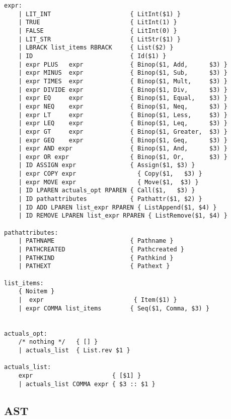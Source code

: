 \documentclass[11pt]{article}
\begin{document}
\begin{listing}[H]
  \begin{verbatim}
expr:
    | LIT_INT                      { LitInt($1) }
    | TRUE                         { LitInt(1) }
    | FALSE                        { LitInt(0) }
    | LIT_STR                      { LitStr($1) }
    | LBRACK list_items RBRACK     { List($2) }
    | ID                           { Id($1) }
    | expr PLUS   expr             { Binop($1, Add,      $3) }
    | expr MINUS  expr             { Binop($1, Sub,      $3) }
    | expr TIMES  expr             { Binop($1, Mult,     $3) }
    | expr DIVIDE expr             { Binop($1, Div,      $3) }
    | expr EQ     expr             { Binop($1, Equal,    $3) }
    | expr NEQ    expr             { Binop($1, Neq,      $3) }
    | expr LT     expr             { Binop($1, Less,     $3) }
    | expr LEQ    expr             { Binop($1, Leq,      $3) }
    | expr GT     expr             { Binop($1, Greater,  $3) }
    | expr GEQ    expr             { Binop($1, Geq,      $3) }
    | expr AND expr                { Binop($1, And,      $3) }
    | expr OR expr                 { Binop($1, Or,       $3) }
    | ID ASSIGN expr               { Assign($1, $3) }
    | expr COPY expr                 { Copy($1,   $3) }
    | expr MOVE expr                 { Move($1,  $3) }
    | ID LPAREN actuals_opt RPAREN { Call($1,   $3) }
    | ID pathattributes            { Pathattr($1, $2) }
    | ID ADD LPAREN list_expr RPAREN { ListAppend($1, $4) }
    | ID REMOVE LPAREN list_expr RPAREN { ListRemove($1, $4) }

pathattributes:
    | PATHNAME                     { Pathname }
    | PATHCREATED                  { Pathcreated }
    | PATHKIND                     { Pathkind }
    | PATHEXT                      { Pathext }

list_items:
    { Noitem }
    |  expr                         { Item($1) }
    | expr COMMA list_items        { Seq($1, Comma, $3) }


actuals_opt:
    /* nothing */   { [] }
    | actuals_list  { List.rev $1 }

actuals_list:
    expr                      { [$1] }
    | actuals_list COMMA expr { $3 :: $1 }
  \end{verbatim}
\end{listing}

\newpage

\subsection{AST}
\end{document}
